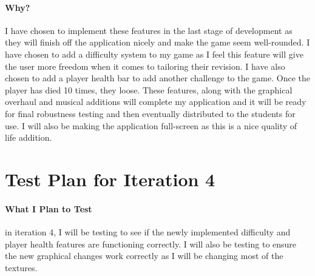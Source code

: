 \documentclass[12pt]{report}
\begin{document}
\paragraph{Why?}
I have chosen to implement these features in the last stage of development as they will finish off the application nicely and make the game seem well-rounded. I have chosen to add a difficulty system to my game as I feel this feature will give the user more freedom when it comes to tailoring their revision. I have also chosen to add a player health bar to add another challenge to the game. Once the player has died 10 times, they loose. These features, along with the graphical overhaul and musical additions will complete my application and it will be ready for final robustness testing and then eventually distributed to the students for use. I will also be making the application full-screen as this is a nice quality of life addition.

\pagebreak

\section{Test Plan for Iteration 4}

\paragraph{What I Plan to Test}
in iteration 4, I will be testing to see if the newly implemented difficulty and player health features are functioning correctly. I will also be testing to ensure the new graphical changes work correctly as I will be changing most of the textures. 
\end{document}
